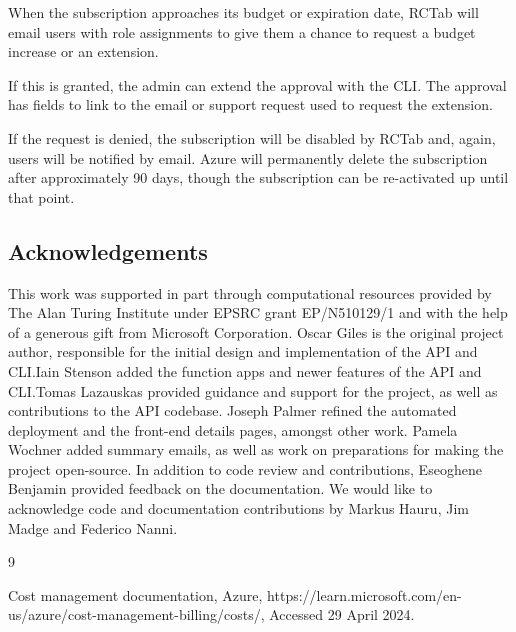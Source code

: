 \documentclass{article}
\begin{document}
When the subscription approaches its budget or expiration date, RCTab
will email users with role assignments to give them a chance to request
a budget increase or an extension.

If this is granted, the admin can extend the approval with the CLI. The
approval has fields to link to the email or support request used to
request the extension.

If the request is denied, the subscription will be disabled by RCTab
and, again, users will be notified by email. Azure will permanently
delete the subscription after approximately 90 days, though the
subscription can be re-activated up until that point.

\subsection{Acknowledgements}\label{acknowledgements}

This work was supported in part through computational resources
provided by The Alan Turing Institute under EPSRC grant EP/N510129/1
and with the help of a generous gift from Microsoft Corporation. Oscar
Giles is the original project author, responsible for the initial
design and implementation of the API and CLI.\@ Iain Stenson added the
function apps and newer features of the API and CLI.\@ Tomas Lazauskas
provided guidance and support for the project, as well as
contributions to the API codebase. Joseph Palmer refined the automated
deployment and the front-end details pages, amongst other work. Pamela
Wochner added summary emails, as well as work on preparations for
making the project open-source. In addition to code review and
contributions, Eseoghene Benjamin provided feedback on the
documentation. We would like to acknowledge code and documentation
contributions by Markus Hauru, Jim Madge and Federico Nanni.

\begin{thebibliography}{9}

    Cost management documentation,
    Azure,
    https://learn.microsoft.com/en-us/azure/cost-management-billing/costs/,
    Accessed 29 April 2024.

\end{thebibliography}
\end{document}
